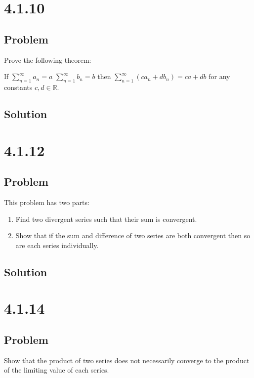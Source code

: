 \documentclass[12pt]{article}
\newcommand{\R}    [0]{\mathbb{R}                   }
\begin{document}
\section*{4.1.10}

\subsection*{Problem}
Prove the following theorem:

If $\sum_{n = 1}^\infty a_n = a$ $\sum_{n = 1}^\infty b_n = b$ then $\sum_{n = 1}^\infty (c a_n + d b_n) = ca + db$ for any constants $c, d \in \R$.

\subsection*{Solution}



\section*{4.1.12}

\subsection*{Problem}
This problem has two parts:
\begin{enumerate}
    \item Find two divergent series such that their sum is convergent.
    \item Show that if the sum and difference of two series are both convergent then so are each series individually.
\end{enumerate}

\subsection*{Solution}



\section*{4.1.14}

\subsection*{Problem}
Show that the product of two series does not necessarily converge to the product of the limiting value of each series.
\end{document}
